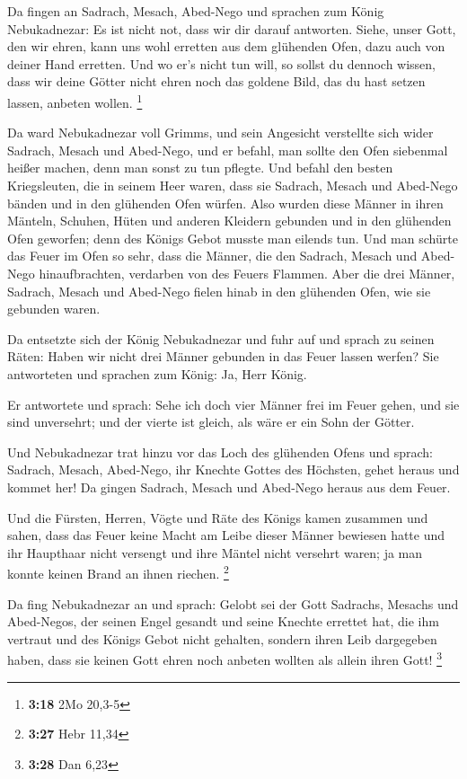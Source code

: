  Da fingen an Sadrach, Mesach, Abed-Nego und sprachen zum
König Nebukadnezar: Es ist nicht not, dass wir dir darauf antworten.
 Siehe, unser Gott, den wir ehren, kann uns wohl erretten
aus dem glühenden Ofen, dazu auch von deiner Hand erretten.
 Und wo er's nicht tun will, so sollst du dennoch wissen,
dass wir deine Götter nicht ehren noch das goldene Bild, das du hast
setzen lassen, anbeten wollen. \footnote{\textbf{3:18} 2Mo 20,3-5}

 Da ward Nebukadnezar voll Grimms, und sein Angesicht
verstellte sich wider Sadrach, Mesach und Abed-Nego, und er befahl, man
sollte den Ofen siebenmal heißer machen, denn man sonst zu tun pflegte.
 Und befahl den besten Kriegsleuten, die in seinem Heer
waren, dass sie Sadrach, Mesach und Abed-Nego bänden und in den
glühenden Ofen würfen.  Also wurden diese Männer in ihren
Mänteln, Schuhen, Hüten und anderen Kleidern gebunden und in den
glühenden Ofen geworfen;  denn des Königs Gebot musste man
eilends tun. Und man schürte das Feuer im Ofen so sehr, dass die Männer,
die den Sadrach, Mesach und Abed-Nego hinaufbrachten, verdarben von des
Feuers Flammen.  Aber die drei Männer, Sadrach, Mesach und
Abed-Nego fielen hinab in den glühenden Ofen, wie sie gebunden waren.

 Da entsetzte sich der König Nebukadnezar und fuhr auf und
sprach zu seinen Räten: Haben wir nicht drei Männer gebunden in das
Feuer lassen werfen? Sie antworteten und sprachen zum König: Ja, Herr
König.

 Er antwortete und sprach: Sehe ich doch vier Männer frei
im Feuer gehen, und sie sind unversehrt; und der vierte ist gleich, als
wäre er ein Sohn der Götter.

 Und Nebukadnezar trat hinzu vor das Loch des glühenden
Ofens und sprach: Sadrach, Mesach, Abed-Nego, ihr Knechte Gottes des
Höchsten, gehet heraus und kommet her! Da gingen Sadrach, Mesach und
Abed-Nego heraus aus dem Feuer.

 Und die Fürsten, Herren, Vögte und Räte des Königs kamen
zusammen und sahen, dass das Feuer keine Macht am Leibe dieser Männer
bewiesen hatte und ihr Haupthaar nicht versengt und ihre Mäntel nicht
versehrt waren; ja man konnte keinen Brand an ihnen riechen. \footnote{\textbf{3:27}
  Hebr 11,34}

 Da fing Nebukadnezar an und sprach: Gelobt sei der Gott
Sadrachs, Mesachs und Abed-Negos, der seinen Engel gesandt und seine
Knechte errettet hat, die ihm vertraut und des Königs Gebot nicht
gehalten, sondern ihren Leib dargegeben haben, dass sie keinen Gott
ehren noch anbeten wollten als allein ihren Gott! \footnote{\textbf{3:28}
  Dan 6,23}

